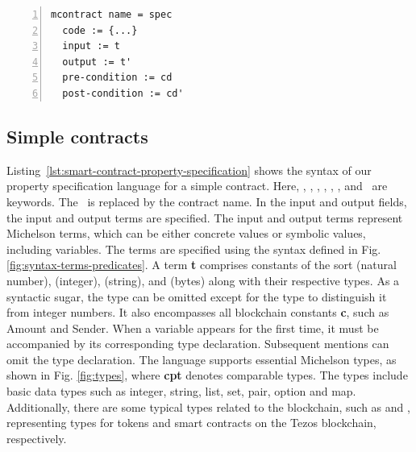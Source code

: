 \documentclass[a4paper,USenglish,cleveref, autoref,anonymous]{lipics-v2021}
\begin{document}
\begin{lstlisting}[float=tp,captionpos=b,caption={Smart contract property specification for a simple contract},label={lst:smart-contract-property-specification},numbers=left]
mcontract name = spec
  code := {...}
  input := t
  output := t'
  pre-condition := cd
  post-condition := cd'
\end{lstlisting}

\subsection{Simple contracts}
\label{sec:simple-contracts}
Listing~\ref{lst:smart-contract-property-specification} shows the
syntax of our property specification language for a simple contract. Here, \KMCONTRACT,
\KSPEC, \KCODE, \KINPUT, \KOUTPUT, \KPRECONDI, and \KPOSTCONDI\ are
keywords. The \KNAME\ is replaced by the contract name. In the input
and output fields, the input and output terms are specified. The input and output terms represent Michelson terms, which can be either concrete values or symbolic values, including variables. The terms are specified using the syntax defined in Fig. \ref{fig:syntax-terms-predicates}. A term \textbf{t} comprises constants of the sort  (natural number),  (integer),  (string), and  (bytes) along with their respective types. As a syntactic sugar, the type can be omitted except for the type  to distinguish it from integer numbers. It also encompasses all blockchain constants \textbf{c}, such as Amount and Sender. When a variable appears for the first time, it must be accompanied by its corresponding type declaration. Subsequent mentions can omit the type declaration. The language supports essential Michelson types, as shown in Fig. \ref{fig:types}, where \textbf{cpt} denotes comparable types. The types include basic data types such as integer, string, list, set, pair, option and map. Additionally, there are some typical types related to the blockchain, such as  and , representing types for tokens and smart contracts on the Tezos blockchain, respectively.
\end{document}
